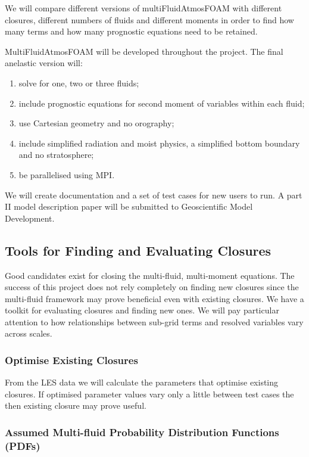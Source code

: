 \documentclass[11pt,a4paper]{article}
\begin{document}
We will compare different versions of multiFluidAtmosFOAM with different closures, different numbers of fluids and different moments in order to find how many terms and how many prognostic equations need to be retained. 


MultiFluidAtmosFOAM will be developed throughout the project. The final anelastic version will:
\begin{enumerate}
\item solve for one, two or three fluids;
\item include prognostic equations for second moment of variables within each fluid;
\item use Cartesian geometry and no orography;
\item include simplified radiation and moist physics, a simplified bottom boundary and no stratosphere;
\item be parallelised using MPI.
\end{enumerate}
We will create documentation and a set of test cases for new users to run. A part II model description paper will be submitted to Geoscientific Model Development.

\subsection{Tools for Finding and Evaluating Closures}
\label{sec:tools}

Good candidates exist for closing the multi-fluid, multi-moment equations. The success of this project does not rely completely on finding new closures since the multi-fluid framework may prove beneficial even with existing closures. We have a toolkit for evaluating closures and finding new ones. We will pay particular attention to how relationships between sub-grid terms and resolved variables vary across scales. 

\subsubsection*{Optimise Existing Closures}

From the LES data we will calculate the parameters that optimise existing closures. If optimised parameter values vary only a little between test cases the then existing closure may prove useful.

\subsubsection*{Assumed Multi-fluid Probability Distribution Functions (PDFs)}
\end{document}
